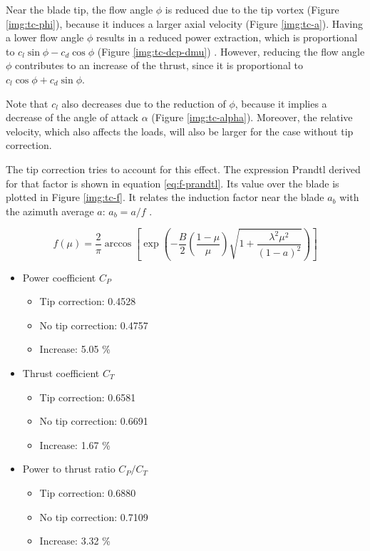 Near the blade tip, the flow angle $ \phi $ is reduced due to the tip vortex (Figure \ref{img:tc-phi}), because it induces a larger axial velocity (Figure \ref{img:tc-a}). Having a lower flow angle $ \phi $ results in a reduced power extraction, which is proportional to $ c_l \sin \phi - c_d \cos \phi $ (Figure \ref{img:tc-dcp-dmu}) \cite{weh-ch3}. However, reducing the flow angle $ \phi $ contributes to an increase of the thrust, since it is proportional to $ c_l \cos \phi + c_d \sin \phi $.

Note that $ c_l $ also decreases due to the reduction of $ \phi $, because it implies a decrease of the angle of attack $ \alpha $ (Figure \ref{img:tc-alpha}). Moreover, the relative velocity, which also affects the loads, will also be larger for the case without tip correction.

The tip correction tries to account for this effect. The expression Prandtl derived for that factor is shown in equation \ref{eq:f-prandtl}. Its value over the blade is plotted in Figure \ref{img:tc-f}. It relates the induction factor near the blade $ a_b $ with the azimuth average $ a $: $ a_b = a/f $ \cite{weh-ch3}.

\begin{equation}
f(\mu) = \frac{2}{\pi} \arccos \left[ \exp \left( - \frac{B}{2} \left( \frac{1-\mu}{\mu} \right) \sqrt{1+\frac{\lambda^2\mu^2}{(1-a)^2}} \right) \right]
\label{eq:f-prandtl}
\end{equation}

\begin{itemize}
	
	\item Power coefficient $ C_P $
	\begin{itemize}
		\item Tip correction: 0.4528
		\item No tip correction: 0.4757
		\item Increase: 5.05 \%
	\end{itemize}
	
	\item Thrust coefficient $ C_T $
	\begin{itemize}
		\item Tip correction: 0.6581
		\item No tip correction: 0.6691
		\item Increase: 1.67 \%
	\end{itemize}
	
	\item Power to thrust ratio $ C_P/C_T $
	\begin{itemize}
		\item Tip correction: 0.6880
		\item No tip correction: 0.7109
		\item Increase: 3.32 \%
	\end{itemize}
	
\end{itemize}


